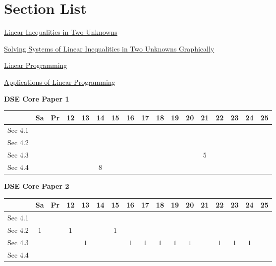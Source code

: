 \documentclass[12pt, a4paper]{article}
\begin{document}
\section*{Section List}
\begin{enumx}[label=Sec 4.\arabic*\ ]
\item \hyperref[section:5-4-1]{Linear Inequalities in Two Unknowns \NF}
\item \hyperref[section:5-4-2]{Solving Systems of Linear Inequalities in Two Unknowns Graphically \NF}
\item \hyperref[section:5-4-3]{Linear Programming \NF}
\item \hyperref[section:5-4-4]{Applications of Linear Programming \NF}
\end{enumx}
\begin{absolutelynopagebreak}
\begin{center}
\textbf{DSE Core Paper 1}
\end{center}
\begin{center}
\begin{tabular}{|l|c|c|c|c|c|c|c|c|c|c|c|c|c|c|c|c|}
\hline
        & Sa & Pr & 12 & 13 & 14 & 15 & 16 & 17 & 18 & 19 & 20 & 21 & 22 & 23 & 24 & 25 \\\hline\hline
Sec 4.1 &  &  &  &  &  &  &  &  &  &  &  &  &  &  &  &  \\\hline
Sec 4.2 &  &  &  &  &  &  &  &  &  &  &  &  &  &  &  &  \\\hline
Sec 4.3 &  &  &  &  &  &  &  &  &  &  &  &  $5$ &  &  &  &  \\\hline
Sec 4.4 &  &  &  &  &  $8$ &  &  &  &  &  &  &  &  &  &  &  \\\hline
\end{tabular}
\end{center}
\end{absolutelynopagebreak}
\begin{absolutelynopagebreak}
\begin{center}
\textbf{DSE Core Paper 2}
\end{center}
\begin{center}
\begin{tabular}{|l|c|c|c|c|c|c|c|c|c|c|c|c|c|c|c|c|}
\hline
        & Sa & Pr & 12 & 13 & 14 & 15 & 16 & 17 & 18 & 19 & 20 & 21 & 22 & 23 & 24 & 25 \\\hline\hline
Sec 4.1 &  &  &  &  &  &  &  &  &  &  &  &  &  &  &  &  \\\hline
Sec 4.2 &  $1$ &  &  $1$ &  &  &  $1$ &  &  &  &  &  &  &  &  &  &  \\\hline
Sec 4.3 &  &  &  &  $1$ &  &  &  $1$ &  $1$ &  $1$ &  $1$ &  $1$ &  &  $1$ &  $1$ &  $1$ &  \\\hline
Sec 4.4 &  &  &  &  &  &  &  &  &  &  &  &  &  &  &  &  \\\hline
\end{tabular}
\end{center}
\end{absolutelynopagebreak}
\end{document}
